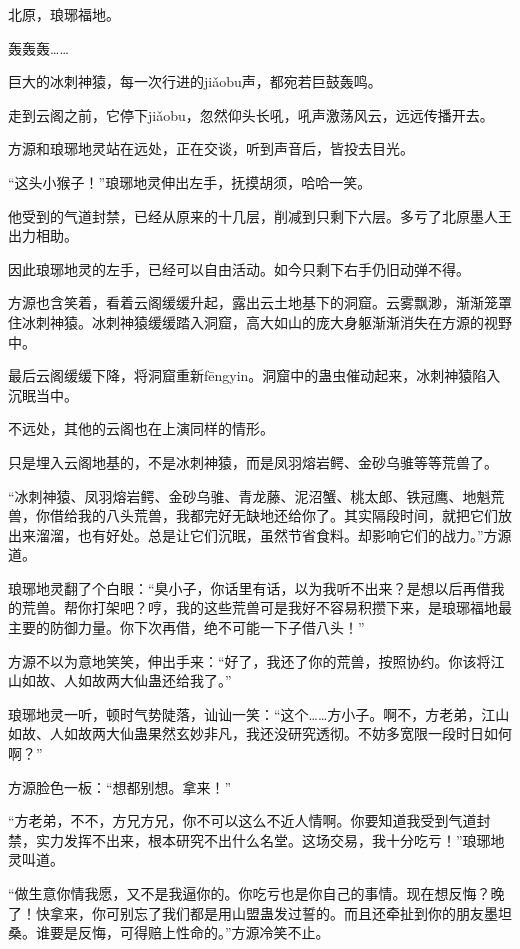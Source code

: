 
\begin{this_body}

北原，琅琊福地。

轰轰轰……

巨大的冰刺神猿，每一次行进的jiǎobu声，都宛若巨鼓轰鸣。

走到云阁之前，它停下jiǎobu，忽然仰头长吼，吼声激荡风云，远远传播开去。

方源和琅琊地灵站在远处，正在交谈，听到声音后，皆投去目光。

“这头小猴子！”琅琊地灵伸出左手，抚摸胡须，哈哈一笑。

他受到的气道封禁，已经从原来的十几层，削减到只剩下六层。多亏了北原墨人王出力相助。

因此琅琊地灵的左手，已经可以自由活动。如今只剩下右手仍旧动弹不得。

方源也含笑着，看着云阁缓缓升起，露出云土地基下的洞窟。云雾飘渺，渐渐笼罩住冰刺神猿。冰刺神猿缓缓踏入洞窟，高大如山的庞大身躯渐渐消失在方源的视野中。

最后云阁缓缓下降，将洞窟重新fēngyin。洞窟中的蛊虫催动起来，冰刺神猿陷入沉眠当中。

不远处，其他的云阁也在上演同样的情形。

只是埋入云阁地基的，不是冰刺神猿，而是凤羽熔岩鳄、金砂乌骓等等荒兽了。

“冰刺神猿、凤羽熔岩鳄、金砂乌骓、青龙藤、泥沼蟹、桃太郎、铁冠鹰、地魁荒兽，你借给我的八头荒兽，我都完好无缺地还给你了。其实隔段时间，就把它们放出来溜溜，也有好处。总是让它们沉眠，虽然节省食料。却影响它们的战力。”方源道。

琅琊地灵翻了个白眼：“臭小子，你话里有话，以为我听不出来？是想以后再借我的荒兽。帮你打架吧？哼，我的这些荒兽可是我好不容易积攒下来，是琅琊福地最主要的防御力量。你下次再借，绝不可能一下子借八头！”

方源不以为意地笑笑，伸出手来：“好了，我还了你的荒兽，按照协约。你该将江山如故、人如故两大仙蛊还给我了。”

琅琊地灵一听，顿时气势陡落，讪讪一笑：“这个……方小子。啊不，方老弟，江山如故、人如故两大仙蛊果然玄妙非凡，我还没研究透彻。不妨多宽限一段时日如何啊？”

方源脸色一板：“想都别想。拿来！”

“方老弟，不不，方兄方兄，你不可以这么不近人情啊。你要知道我受到气道封禁，实力发挥不出来，根本研究不出什么名堂。这场交易，我十分吃亏！”琅琊地灵叫道。

“做生意你情我愿，又不是我逼你的。你吃亏也是你自己的事情。现在想反悔？晚了！快拿来，你可别忘了我们都是用山盟蛊发过誓的。而且还牵扯到你的朋友墨坦桑。谁要是反悔，可得赔上性命的。”方源冷笑不止。


\end{this_body}
